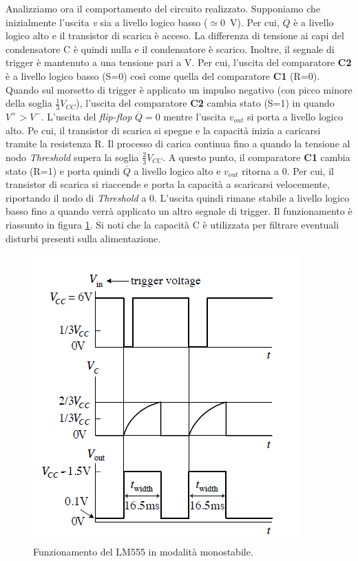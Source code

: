 \newpage
\noindent
Analizziamo ora il comportamento del circuito realizzato. Supponiamo che inizialmente l'uscita \textit{v} sia a livello logico basso ($\simeq$\SI{0}{\volt}). Per cui, $\overline{Q}$ è a livello logico alto e il transistor di scarica è acceso. La differenza di tensione ai capi del condensatore C è quindi nulla e il condensatore è scarico. Inoltre, il segnale di trigger è mantenuto a una tensione pari a V. Per cui, l'uscita del comparatore \textbf{C2} è a livello logico basso (S=0) così come quella del comparatore \textbf{C1} (R=0). Quando sul morsetto di trigger è applicato un impulso negativo (con picco minore della soglia $\frac{1}{3}V_{CC}$), l'uscita del comparatore \textbf{C2} cambia stato (S=1) in quando $V^+>V^-$. L'uscita del \textit{flip-flop} $\overline{Q}=0$ mentre l'uscita $v_{out}$ si porta a livello logico alto. Pe cui, il transistor di scarica si spegne e la capacità inizia a caricarsi tramite la resistenza R. Il processo di carica continua fino a quando la tensione al nodo \textit{Threshold} supera la soglia $\frac{2}{3}V_{CC}$. A questo punto, il comparatore \textbf{C1} cambia stato (R=1) e porta quindi $\overline{Q}$ a livello logico alto e $v_{out}$ ritorna a 0. Per cui, il transistor di scarica si riaccende e porta la capacità a scaricarsi velocemente, riportando il nodo di \textit{Threshold} a 0. L'uscita quindi rimane stabile a livello logico basso fino a quando verrà applicato un altro segnale di trigger. Il funzionamento è riassunto in figura \ref{fig:555_mono}. Si noti che la capacità C è utilizzata per filtrare eventuali disturbi presenti sulla alimentazione.
\begin{figure}[h]
	\centering
	\includegraphics[width=0.5\linewidth]{./ImageFiles/Laboratorio 4/timer555}
	\caption{Funzionamento del LM555 in modalità monostabile.}
	\label{fig:555_mono}
\end{figure}

